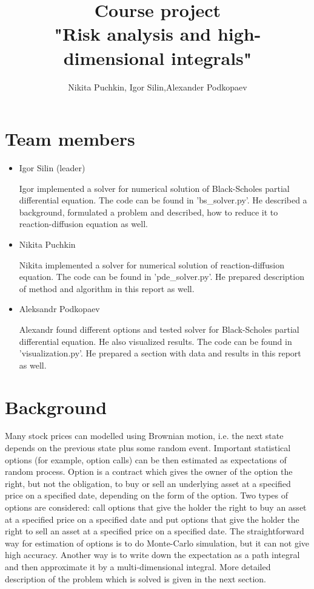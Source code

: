 \documentclass[11pt,a4paper]{extarticle}
\title{Course project \\
"Risk analysis and high-dimensional integrals"}
\author{ Nikita Puchkin, Igor Silin,Alexander Podkopaev }
\begin{document}
\maketitle

\section{Team members}

\begin{itemize}

\item Igor Silin (leader)

Igor implemented a solver for numerical solution of Black-Scholes partial differential equation.
The code can be found in 'bs\_solver.py'.
He described a background, formulated a problem and described, how to reduce it to reaction-diffusion equation as well.

\item Nikita Puchkin

Nikita implemented a solver for numerical solution of reaction-diffusion equation.
The code can be found in 'pde\_solver.py'.
He prepared description of method and algorithm in this report as well.

\item Aleksandr Podkopaev

Alexandr found different options and tested solver for Black-Scholes partial differential equation.
He also visualized results.
The code can be found in 'visualization.py'.
He prepared a section with data and results in this report as well.

\end{itemize}

\section{Background}

Many stock prices can modelled using Brownian motion, i.e. the next state depends on the previous state plus some random event. Important statistical options (for example, option calls) can be then estimated as expectations of random process. Option is a contract which gives the owner of the option the right, but not the obligation, to buy or sell an underlying asset at a specified price on a specified date, depending on the form of the option. Two types of options are considered: call options that give the holder the right to buy an asset at a specified price on a specified date and put options that give the holder the right to sell an asset at a specified price on a specified date. The straightforward way for estimation of options is to do Monte-Carlo simulation, but it can not give high accuracy. Another way is to write down the expectation as a path integral and then approximate it by a multi-dimensional integral. More detailed description of the problem which is solved is given in the next section.
\end{document}

